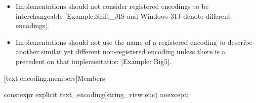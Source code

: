 \documentclass{wg21}
\begin{document}
\begin{addedblock}
\recommended
\begin{itemize}
\item Implementations should not consider registered encodings to be interchangeable [Example:Shift_JIS and Windows-31J denote different encodings].
\item Implementations should not use the name of a registered encoding to describe another similar yet different non-registered encoding unless there is a precedent on that implementation [Example: Big5].
\end{itemize}




[text.encoding.members]{Members}

\begin{itemdecl}
constexpr explicit text_encoding(string_view enc) noexcept;
\end{itemdecl}


\end{addedblock}
\end{document}
